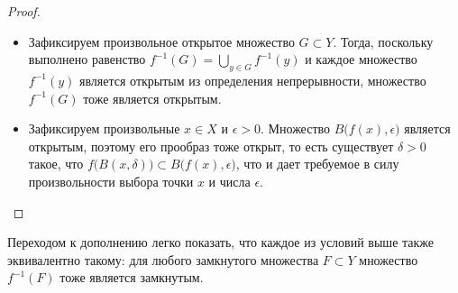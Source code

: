 \begin{proof}~
	\begin{itemize}
		\item{}Зафиксируем произвольное открытое множество $G \subset Y$. Тогда, поскольку выполнено равенство $f^{-1}(G) = \bigcup_{y \in G}f^{-1}(y)$ и каждое множество $f^{-1}(y)$ является открытым из определения непрерывности, множество $f^{-1}(G)$ тоже является открытым.

		\item{}Зафиксируем произвольные $x \in X$ и $\epsilon > 0$. Множество $B\big(f(x), \epsilon\big)$ является открытым, поэтому его прообраз тоже открыт, то есть существует $\delta > 0$ такое, что $f\big(B(x, \delta)\big) \subset B\big(f(x), \epsilon\big)$, что и дает требуемое в силу произвольности выбора точки $x$ и числа $\epsilon$.\qedhere
	\end{itemize}
\end{proof}

\begin{note}
	Переходом к дополнению легко показать, что каждое из условий выше также эквивалентно такому: для любого замкнутого множества $F \subset Y$ множество $f^{-1}(F)$ тоже является замкнутым.
\end{note}